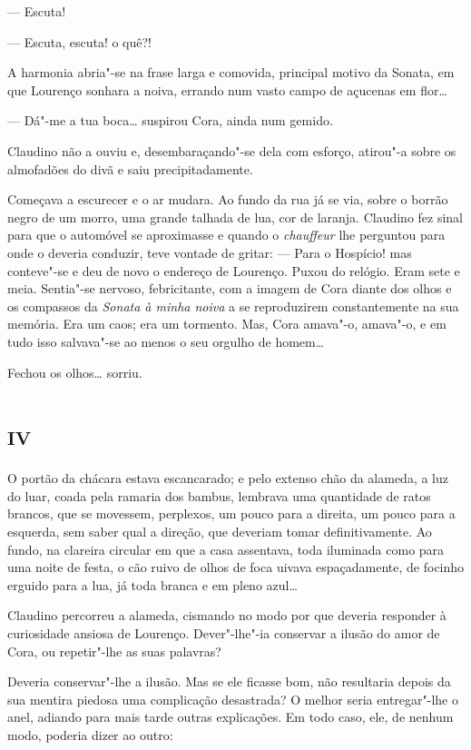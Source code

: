 --- Escuta!

--- Escuta, escuta! o quê?!

A harmonia abria"-se na frase larga e comovida, principal motivo da
Sonata, em que Lourenço sonhara a noiva, errando num vasto campo de
açucenas em flor\ldots{}

--- Dá"-me a tua boca\ldots{} suspirou Cora, ainda num gemido.

Claudino não a ouviu e, desembaraçando"-se dela com esforço, atirou"-a
sobre os almofadões do divã e saiu precipitadamente.

Começava a escurecer e o ar mudara. Ao fundo da rua já se via, sobre o
borrão negro de um morro, uma grande talhada de lua, cor de laranja.
Claudino fez sinal para que o automóvel se aproximasse e quando o
\emph{chauffeur} lhe perguntou para onde o deveria conduzir, teve
vontade de gritar: --- Para o Hospício! mas conteve"-se e deu de novo o
endereço de Lourenço. Puxou do relógio. Eram sete e meia. Sentia"-se
nervoso, febricitante, com a imagem de Cora diante dos olhos e os
compassos da \emph{Sonata à minha noiva} a se reproduzirem
constantemente na sua memória. Era um caos; era um tormento. Mas, Cora
amava"-o, amava"-o, e em tudo isso salvava"-se ao menos o seu orgulho de
homem\ldots{}

Fechou os olhos\ldots{} sorriu.

\section{\textsc{iv}}

O portão da chácara estava escancarado; e pelo extenso chão da alameda,
a luz do luar, coada pela ramaria dos bambus, lembrava uma quantidade de
ratos brancos, que se movessem, perplexos, um pouco para a direita, um
pouco para a esquerda, sem saber qual a direção, que deveriam tomar
definitivamente. Ao fundo, na clareira circular em que a casa assentava,
toda iluminada como para uma noite de festa, o cão ruivo de olhos de
foca uivava espaçadamente, de focinho erguido para a lua, já toda branca
e em pleno azul\ldots{}

Claudino percorreu a alameda, cismando no modo por que deveria responder
à curiosidade ansiosa de Lourenço. Dever"-lhe"-ia conservar a ilusão do
amor de Cora, ou repetir"-lhe as suas palavras?

Deveria conservar"-lhe a ilusão. Mas se ele ficasse bom, não resultaria
depois da sua mentira piedosa uma complicação desastrada? O melhor seria
entregar"-lhe o anel, adiando para mais tarde outras explicações. Em todo
caso, ele, de nenhum modo, poderia dizer ao outro:

